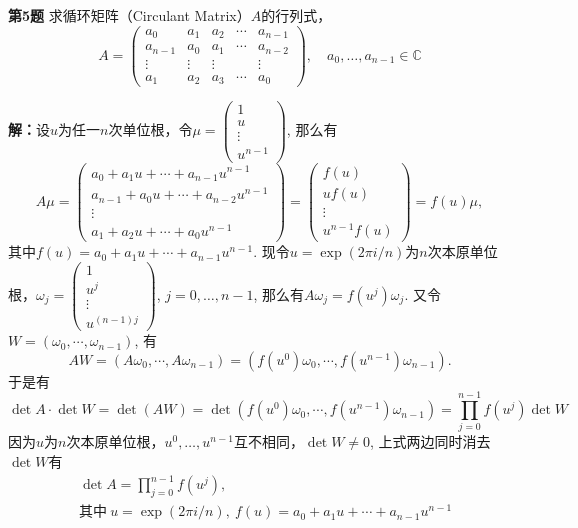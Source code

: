 \newpageorvspace

{\bf 第5题} 求循环矩阵（Circulant Matrix）$A$的行列式，
$$A = \begin{pmatrix} a_0 & a_1 & a_2 & \cdots & a_{n-1} \\ a_{n-1} & a_0 & a_1 & \cdots & a_{n-2} \\ \vdots & \vdots & \vdots & & \vdots \\ a_1 & a_2 & a_3 & \cdots & a_0 \end{pmatrix}, \quad a_0,\ldots,a_{n-1} \in \mathbb{C}$$

{\bf 解：}设$u$为任一$n$次单位根，令$\mu = \begin{pmatrix} 1 \\ u \\ \vdots \\ u^{n-1} \end{pmatrix}$, 那么有
$$A\mu = \begin{pmatrix} a_0 + a_1u + \cdots + a_{n-1}u^{n-1} \\ a_{n-1} + a_0u + \cdots + a_{n-2}u^{n-1} \\ \vdots \\ a_1 + a_2u + \cdots + a_0u^{n-1} \end{pmatrix} = \begin{pmatrix} f(u) \\ uf(u) \\ \vdots \\ u^{n-1}f(u) \end{pmatrix} = f(u)\mu,$$
其中$f(u) = a_0 + a_1u + \cdots + a_{n-1}u^{n-1}$. 现令$u = \exp(2\pi i/n)$为$n$次本原单位根，$\omega_j = \begin{pmatrix} 1 \\ u^j \\ \vdots \\ u^{(n-1)j} \end{pmatrix}$, $j=0,\ldots,n-1$, 那么有$A\omega_j = f(u^j)\omega_j$. 又令$W = (\omega_0, \cdots, \omega_{n-1})$, 有
$$AW = (A\omega_0, \cdots, A\omega_{n-1}) = (f(u^0)\omega_0, \cdots, f(u^{n-1})\omega_{n-1}).$$
于是有
$$\det A \cdot \det W = \det(AW) = \det(f(u^0)\omega_0, \cdots, f(u^{n-1})\omega_{n-1}) = \prod_{j=0}^{n-1}f(u^j) \det W$$
因为$u$为$n$次本原单位根，$u^0, \ldots, u^{n-1}$互不相同，$\det W \neq 0$, 上式两边同时消去$\det W$有
\begin{align*}
& \det A = \prod_{j=0}^{n-1}f(u^j), \\
& \text{其中}\  u = \exp(2\pi i/n), \ f(u) = a_0 + a_1u + \cdots + a_{n-1}u^{n-1}
\end{align*}

